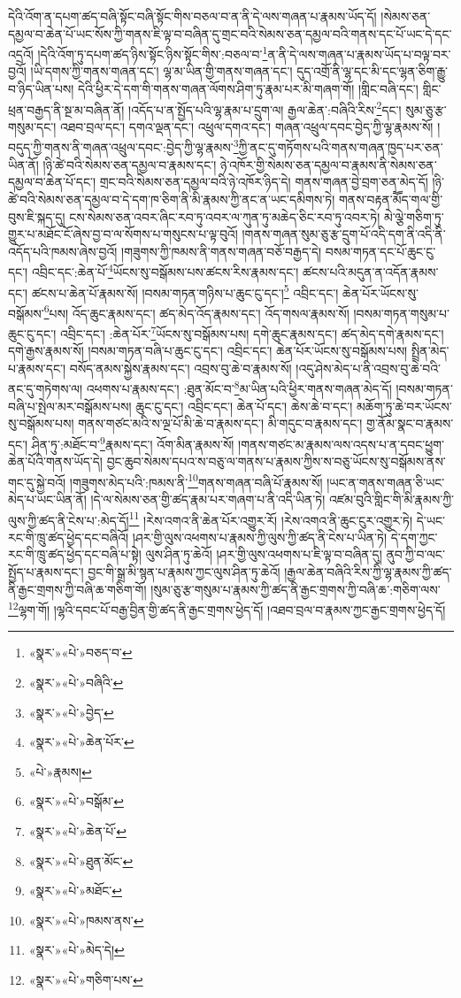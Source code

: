 དེའི་འོག་ན་དཔག་ཚད་བཞི་སྟོང་བཞི་སྟོང་གིས་བཅལ་བ་ན་ནི་དེ་ལས་གཞན་པ་རྣམས་ཡོད་དོ། །སེམས་ཅན་དམྱལ་བ་ཆེན་པོ་ཡང་སོས་ཀྱི་གནས་ཇི་ལྟ་བ་བཞིན་དུ་གྲང་བའི་སེམས་ཅན་དམྱལ་བའི་གནས་དང་པོ་ཡང་དེ་དང་འདྲའོ། །དེའི་འོག་ཏུ་དཔག་ཚད་ཉིས་སྟོང་ཉིས་སྟོང་གིས་:བཅལ་བ་\footnote{«སྣར་»«པེ་»བཅད་བ་}ན་ནི་དེ་ལས་གཞན་པ་རྣམས་ཡོད་པ་བལྟ་བར་བྱའོ། །ཡི་དགས་ཀྱི་གནས་གཞན་དང་། ལྷ་མ་ཡིན་གྱི་གནས་གཞན་དང་། དུད་འགྲོ་ནི་ལྷ་དང་མི་དང་ལྷན་ཅིག་རྒྱུ་བ་ཉིད་ཡིན་པས། དེའི་ཕྱིར་དེ་དག་གི་གནས་གཞན་ལོགས་ཤིག་ཏུ་རྣམ་པར་མི་གཞག་གོ། །གླིང་བཞི་དང་། གླིང་ཕྲན་བརྒྱད་ནི་སྔ་མ་བཞིན་ནོ། །འདོད་པ་ན་སྤྱོད་པའི་ལྷ་རྣམ་པ་དྲུག་ལ། རྒྱལ་ཆེན་:བཞིའི་རིས་\footnote{«སྣར་»«པེ་»བཞིའི་}དང་། སུམ་ཅུ་རྩ་གསུམ་དང་། འཐབ་བྲལ་དང་། དགའ་ལྡན་དང་། འཕྲུལ་དགའ་དང་། གཞན་འཕྲུལ་དབང་བྱེད་ཀྱི་ལྷ་རྣམས་སོ། །བདུད་ཀྱི་གནས་ནི་གཞན་འཕྲུལ་དབང་:བྱེད་ཀྱི་ལྷ་རྣམས་\footnote{«སྣར་»«པེ་»བྱེད་}ཀྱི་ནང་དུ་གཏོགས་པའི་གནས་གཞན་ཁྱད་པར་ཅན་ཡིན་ནོ། །ཉི་ཚེ་བའི་སེམས་ཅན་དམྱལ་བ་རྣམས་དང་། ཉེ་འཁོར་གྱི་སེམས་ཅན་དམྱལ་བ་རྣམས་ནི་སེམས་ཅན་དམྱལ་བ་ཆེན་པོ་དང་། གྲང་བའི་སེམས་ཅན་དམྱལ་བའི་ཉེ་འཁོར་ཉིད་དེ། གནས་གཞན་བྱེ་བྲག་ཅན་མེད་དོ། །ཉི་ཚེ་བའི་སེམས་ཅན་དམྱལ་བ་དེ་དག་ཁ་ཅིག་ནི་མི་རྣམས་ཀྱི་ནང་ན་ཡང་དམིགས་ཏེ། གནས་བརྟན་མཽད་གལ་གྱི་བུས་ཇི་སྐད་དུ། ངས་སེམས་ཅན་འབར་ཞིང་རབ་ཏུ་འབར་ལ་ཀུན་ཏུ་མཆེད་ཅིང་རབ་ཏུ་འབར་ཏེ། མེ་ལྕེ་གཅིག་ཏུ་གྱུར་པ་མཐོང་ངོ་ཞེས་བྱ་བ་ལ་སོགས་པ་གསུངས་པ་ལྟ་བུའོ། །གནས་གཞན་སུམ་ཅུ་རྩ་དྲུག་པོ་འདི་དག་ནི་འདི་ནི་འདོད་པའི་ཁམས་ཞེས་བྱའོ། །གཟུགས་ཀྱི་ཁམས་ནི་གནས་གཞན་བཅོ་བརྒྱད་དེ། བསམ་གཏན་དང་པོ་ཆུང་ངུ་དང་། འབྲིང་དང་:ཆེན་པོ་\footnote{«སྣར་»«པེ་»ཆེན་པོར་}ཡོངས་སུ་བསྒོམས་པས་ཚངས་རིས་རྣམས་དང་། ཚངས་པའི་མདུན་ན་འདོན་རྣམས་དང་། ཚངས་པ་ཆེན་པོ་རྣམས་སོ། །བསམ་གཏན་གཉིས་པ་ཆུང་ངུ་དང་།\footnote{«པེ་»རྣམས།} འབྲིང་དང་། ཆེན་པོར་ཡོངས་སུ་བསྒོམས་\footnote{«སྣར་»«པེ་»བསྒོམ་}པས། འོད་ཆུང་རྣམས་དང་། ཚད་མེད་འོད་རྣམས་དང་། འོད་གསལ་རྣམས་སོ། །བསམ་གཏན་གསུམ་པ་ཆུང་ངུ་དང་། འབྲིང་དང་། :ཆེན་པོར་\footnote{«སྣར་»«པེ་»ཆེན་པོ་}ཡོངས་སུ་བསྒོམས་པས། དགེ་ཆུང་རྣམས་དང་། ཚད་མེད་དགེ་རྣམས་དང་། དགེ་རྒྱས་རྣམས་སོ། །བསམ་གཏན་བཞི་པ་ཆུང་ངུ་དང་། འབྲིང་དང་། ཆེན་པོར་ཡོངས་སུ་བསྒོམས་པས། སྤྲིན་མེད་པ་རྣམས་དང་། བསོད་ནམས་སྐྱེས་རྣམས་དང་། འབྲས་བུ་ཆེ་བ་རྣམས་སོ། །འདུ་ཤེས་མེད་པ་ནི་འབྲས་བུ་ཆེ་བའི་ནང་དུ་གཏེགས་ལ། འཕགས་པ་རྣམས་དང་། :ཐུན་མོང་བ་\footnote{«སྣར་»«པེ་»ཐུན་མོང་}མ་ཡིན་པའི་ཕྱིར་གནས་གཞན་མེད་དོ། །བསམ་གཏན་བཞི་པ་སྤེལ་མར་བསྒོམས་པས། ཆུང་ངུ་དང་། འབྲིང་དང་། ཆེན་པོ་དང་། ཆེས་ཆེ་བ་དང་། མཆོག་ཏུ་ཆེ་བར་ཡོངས་སུ་བསྒོམས་པས། གནས་གཙང་མའི་ས་ལྔ་པོ་མི་ཆེ་བ་རྣམས་དང་། མི་གདུང་བ་རྣམས་དང་། གྱ་ནོམ་སྣང་བ་རྣམས་དང་། ཤིན་ཏུ་:མཐོང་བ་\footnote{«སྣར་»«པེ་»མཐོང་}རྣམས་དང་། འོག་མིན་རྣམས་སོ། །གནས་གཙང་མ་རྣམས་ལས་འདས་པ་ན་དབང་ཕྱུག་ཆེན་པོའི་གནས་ཡོད་དེ། བྱང་ཆུབ་སེམས་དཔའ་ས་བཅུ་ལ་གནས་པ་རྣམས་ཀྱིས་ས་བཅུ་ཡོངས་སུ་བསྒོམས་ནས་གང་དུ་སྐྱེ་བའོ། །གཟུགས་མེད་པའི་:ཁམས་ནི་\footnote{«སྣར་»«པེ་»ཁམས་ནས་}གནས་གཞན་བཞི་པོ་རྣམས་སོ། །ཡང་ན་གནས་གཞན་ཅི་ཡང་མེད་པ་ཡང་ཡིན་ནོ། །དེ་ལ་སེམས་ཅན་གྱི་ཚད་རྣམ་པར་གཞག་པ་ནི་འདི་ཡིན་ཏེ། འཛམ་བུའི་གླིང་གི་མི་རྣམས་ཀྱི་ལུས་ཀྱི་ཚད་ནི་ངེས་པ་:མེད་དོ།\footnote{«སྣར་»«པེ་»མེད་དེ།} །རེས་འགའ་ནི་ཆེན་པོར་འགྱུར་རོ། །རེས་འགའ་ནི་ཆུང་ངུར་འགྱུར་ཏེ། དེ་ཡང་རང་གི་ཁྲུ་ཚད་ཕྱེད་དང་བཞིའོ། །ཤར་གྱི་ལུས་འཕགས་པ་རྣམས་ཀྱི་ལུས་ཀྱི་ཚད་ནི་ངེས་པ་ཡིན་ཏེ། དེ་དག་ཀྱང་རང་གི་ཁྲུ་ཚད་ཕྱེད་དང་བཞི་པ་སྟེ། ལུས་ཤིན་ཏུ་ཆེའོ། །ཤར་གྱི་ལུས་འཕགས་པ་ཇི་ལྟ་བ་བཞིན་དུ། ནུབ་ཀྱི་བ་ལང་སྤྱོད་པ་རྣམས་དང་། བྱང་གི་སྒྲ་མི་སྙན་པ་རྣམས་ཀྱང་ལུས་ཤིན་ཏུ་ཆེའོ། །རྒྱལ་ཆེན་བཞིའི་རིས་ཀྱི་ལྷ་རྣམས་ཀྱི་ཚད་ནི་རྒྱང་གྲགས་ཀྱི་བཞི་ཆ་གཅིག་གོ། །སུམ་ཅུ་རྩ་གསུམ་པ་རྣམས་ཀྱི་ཚད་ནི་རྒྱང་གྲགས་ཀྱི་བཞི་ཆ་:གཅིག་ལས་\footnote{«སྣར་»«པེ་»གཅིག་པས་}ལྷག་གོ། །ལྷའི་དབང་པོ་བརྒྱ་བྱིན་གྱི་ཚད་ནི་རྒྱང་གྲགས་ཕྱེད་དོ། །འཐབ་བྲལ་བ་རྣམས་ཀྱང་རྒྱང་གྲགས་ཕྱེད་དོ། 